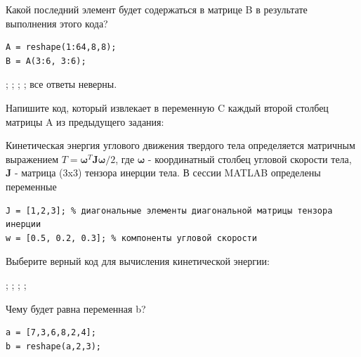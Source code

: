 \documentclass[addpoints,12pt]{exam}
\begin{document}
\vspace{0.1in}
\vspace{0.1in}

\begin{questions}

\question[1]
Какой последний элемент будет содержаться в матрице B в результате выполнения этого кода?
\begin{lstlisting}
A = reshape(1:64,8,8);
B = A(3:6, 3:6); 
\end{lstlisting}
\begin{checkboxes}
;
; 
;
; 
\choice все ответы неверны.
\end{checkboxes}

\question[1] 
Напишите код, который извлекает в переменную C каждый второй столбец матрицы A из предыдущего задания:
\begin{solutionorlines}[1cm]
\end{solutionorlines}

\question[1] Кинетическая энергия углового движения твердого тела определяется матричным выражением $ T = \boldsymbol{\omega}^T \boldsymbol{J} \boldsymbol{\omega} / 2$, где $\boldsymbol{\omega}$ - координатный столбец угловой скорости тела, $\boldsymbol{J}$ - матрица (3x3) тензора инерции тела. В сессии MATLAB определены переменные 
\begin{lstlisting}
J = [1,2,3]; % диагональные элементы диагональной матрицы тензора инерции 
w = [0.5, 0.2, 0.3]; % компоненты угловой скорости
\end{lstlisting}
Выберите верный код для вычисления кинетической энергии:
\begin{checkboxes}
\choice  {};
\choice  {};
\CorrectChoice  {};
\choice  {};
\end{checkboxes}

\question[1] Чему будет равна переменная b?
\begin{lstlisting}
a = [7,3,6,8,2,4];
b = reshape(a,2,3);
\end{lstlisting}
\begin{checkboxes}
\choice  [7, 3, 8; 6, 2, 4]
\CorrectChoice [7, 6, 2; 3, 8, 4]
\choice  [7, 3; 8, 6; 2, 4]
\choice  [7, 6; 2, 3; 8, 4]
\end{checkboxes}


\end{questions}
\end{document}
